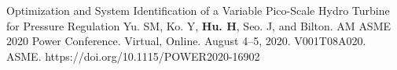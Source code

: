 


\begin{cventries}
  \cvpublicationentrysimple
    {Optimization and System Identification of a Variable Pico-Scale Hydro Turbine for Pressure Regulation} %
    {Yu. SM, Ko. Y, \textbf{Hu. H}, Seo. J, and Bilton. AM} %
    {ASME 2020 Power Conference. Virtual, Online. August 4–5, 2020. V001T08A020. ASME. https://doi.org/10.1115/POWER2020-16902}
\end{cventries}










